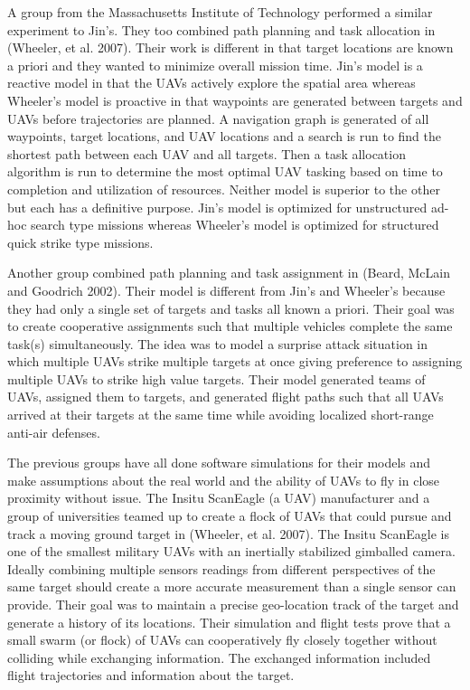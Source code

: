 A group from the Massachusetts Institute of Technology performed a similar experiment to Jin’s.   They too combined path planning and task allocation in (Wheeler, et al. 2007).  Their work is different in that target locations are known a priori and they wanted to minimize overall mission time.  Jin’s model is a reactive model in that the UAVs actively explore the spatial area whereas Wheeler’s model is proactive in that waypoints are generated between targets and UAVs before trajectories are planned.  A navigation graph is generated of all waypoints, target locations, and UAV locations and a search is run to find the shortest path between each UAV and all targets.  Then a task allocation algorithm is run to determine the most optimal UAV tasking based on time to completion and utilization of resources.  Neither model is superior to the other but each has a definitive purpose.  Jin’s model is optimized for unstructured ad-hoc search type missions whereas Wheeler’s model is optimized for structured quick strike type missions.

Another group combined path planning and task assignment in (Beard, McLain and Goodrich 2002).  Their model is different from Jin’s and Wheeler’s because they had only a single set of targets and tasks all known a priori.  Their goal was to create cooperative assignments such that multiple vehicles complete the same task(s) simultaneously.  The idea was to model a surprise attack situation in which multiple UAVs strike multiple targets at once giving preference to assigning multiple UAVs to strike high value targets.  Their model generated teams of UAVs, assigned them to targets, and generated flight paths such that all UAVs arrived at their targets at the same time while avoiding localized short-range anti-air defenses.

The previous groups have all done software simulations for their models and make assumptions about the real world and the ability of UAVs to fly in close proximity without issue.  The Insitu ScanEagle (a UAV) manufacturer and a group of universities teamed up to create a flock of UAVs that could pursue and track a moving ground target in (Wheeler, et al. 2007).  The Insitu ScanEagle is one of the smallest military UAVs with an inertially stabilized gimballed camera.  Ideally combining multiple sensors readings from different perspectives of the same target should create a more accurate measurement than a single sensor can provide.  Their goal was to maintain a precise geo-location track of the target and generate a history of its locations.  Their simulation and flight tests prove that a small swarm (or flock) of UAVs can cooperatively fly closely together without colliding while exchanging information.  The exchanged information included flight trajectories and information about the target. 

